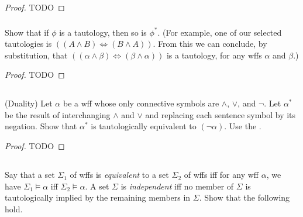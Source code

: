 \documentclass{report}
\begin{document}
  \begin{proof}
    TODO
  \end{proof}

\subsubsection{}%

  Show that if $\phi$ is a tautology, then so is $\phi^*$.
  (For example, one of our selected tautologies is
    $((A \land B) \Leftrightarrow (B \land A))$. From this we can conclude, by
    substitution, that
    $((\alpha \land \beta) \Leftrightarrow (\beta \land \alpha))$ is a
    tautology, for any wffs $\alpha$ and $\beta$.)

  \begin{proof}
    TODO
  \end{proof}

\subsection{}%

  (Duality) Let $\alpha$ be a wff whose only connective symbols are $\land$,
    $\lor$, and $\neg$.
  Let $\alpha^*$ be the result of interchanging $\land$ and $\lor$ and replacing
    each sentence symbol by its negation.
  Show that $\alpha^*$ is tautologically equivalent to $(\neg \alpha)$.
  Use the .

  \begin{proof}
    TODO
  \end{proof}

\subsection{}%

  Say that a set $\Sigma_1$ of wffs is \textit{equivalent} to a set $\Sigma_2$
    of wffs iff for any wff $\alpha$, we have $\Sigma_1 \vDash \alpha$ iff
    $\Sigma_2 \vDash \alpha$.
  A set $\Sigma$ is \textit{independent} iff no member of $\Sigma$ is
    tautologically implied by the remaining members in $\Sigma$.
  Show that the following hold.

\subsubsection{}%
\end{document}
